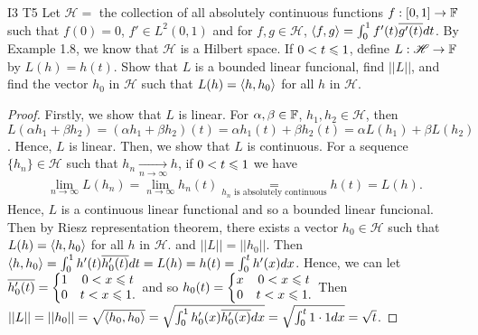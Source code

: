 \begin{exercise}{I3 T5}{}
    Let $\mathscr{H}=$ the collection of all absolutely continuous functions $f:[0,1]\rightarrow \mathbb{F}$ such that $f(0)=0$, $f'\in L^2(0,1)$ 
    and for $f,g\in \mathscr{H}$, $\langle f,g\rangle=\int_{0}^{1} f'(t)\overline{g'(t)}dt$. By Example 1.8, we know that $\mathscr{H}$ is a Hilbert space.
    If $0<t\leqslant 1$, define $L:\mathscr{H}\rightarrow \mathbb{F}$ by $L(h)=h(t)$.
    Show that $L$ is a bounded linear funcional, find $||L||$, 
    and find the vector $h_0$ in $\mathscr{H}$ such that $L(h)=\langle h,h_0\rangle$ for all $h$ in $\mathscr{H}$. 
\end{exercise}
\begin{proof}
    Firstly, we show that $L$ is linear.
    For $\alpha,\beta\in\mathbb{F}$, $h_1,h_2\in\mathscr{H}$, then $L(\alpha h_1+ \beta h_2)=(\alpha h_1+\beta h_2)(t)=\alpha h_1(t) +\beta h_2(t)=\alpha L(h_1)+\beta L(h_2)$.
    Hence, $L$ is linear. Then, we show that $L$ is continuous. For a sequence $\{h_n\}\in \mathscr{H}$ such that $h_n\underset{n\rightarrow \infty}{\longrightarrow} h$,
    if $0<t\leqslant 1$ we have
    \begin{align*}
        \lim_{n\rightarrow \infty}L(h_n)=\lim_{n\rightarrow \infty}h_n(t)\underset{h_n \text{ is absolutely continuous}}{=} h(t)=L(h).
    \end{align*}
    Hence, $L$ is a continuous linear functional and so a bounded linear funcional.
    Then by Riesz representation theorem, there exists a vector $h_0\in \mathscr{H}$ such that $L(h)=\langle h,h_0\rangle$ for all $h$ in $\mathscr{H}$.
    and $||L||=||h_0||$. Then $\langle h,h_0\rangle=\int_{0}^{1}h'(t)\overline{h_0'(t)}dt=L(h)=h(t)=\int_{0}^{t}h'(x)dx$.
    Hence, we can let $\overline{h_0'(t)}=\left\{\begin{matrix}
        1& 0< x\leqslant t \\
        0& t<x\leqslant 1.
      \end{matrix}\right.$ 
      and so $h_0(t)=\left\{\begin{matrix}
        x& 0< x\leqslant t \\
        0& t<x\leqslant 1.
    \end{matrix}\right.$
    Then $||L||=||h_0||=\sqrt{\langle h_0,h_0\rangle}=\sqrt{\int_{0}^{1}h_0'(x)\overline{h_0'(x)}dx}=\sqrt{\int_{0}^{t}1\cdot 1dx}=\sqrt{t}$.
\end{proof}



